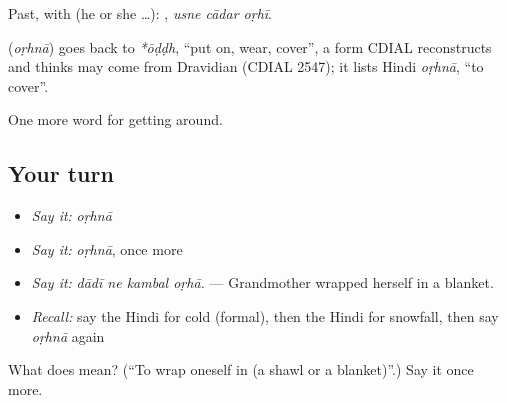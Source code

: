 Past, with  (he or she …):   , \emph{usne cādar oṛhī}.

\begin{cousinweb}
\textbf{} (\emph{oṛhnā}) goes back to \emph{*ōḍḍh}, \textquotedblleft{}put on, wear, cover\textquotedblright{}, a form CDIAL reconstructs and thinks may come from Dravidian (CDIAL 2547); it lists Hindi \emph{oṛhnā}, \textquotedblleft{}to cover\textquotedblright{}.
\end{cousinweb}

\begin{grammarlens}[title={What you've built}]
One more word for getting around.
\end{grammarlens}

\subsection*{Your turn}
\begin{itemize}
\raggedright
  \item \emph{Say it:} \emph{oṛhnā}
  \item \emph{Say it:} \emph{oṛhnā}, once more
  \item \emph{Say it:} \emph{dādī ne kambal oṛhā.} — Grandmother wrapped herself in a blanket.
  \item \emph{Recall:} say the Hindi for cold (formal), then the Hindi for snowfall, then say \emph{oṛhnā} again
\end{itemize}

\begin{tcolorbox}[breakable,colback=teal!4,colframe=teal!35!black,title={Before you move on}]
What does  mean? (\textquotedblleft{}To wrap oneself in (a shawl or a blanket)\textquotedblright{}.) Say it once more.
\end{tcolorbox}
